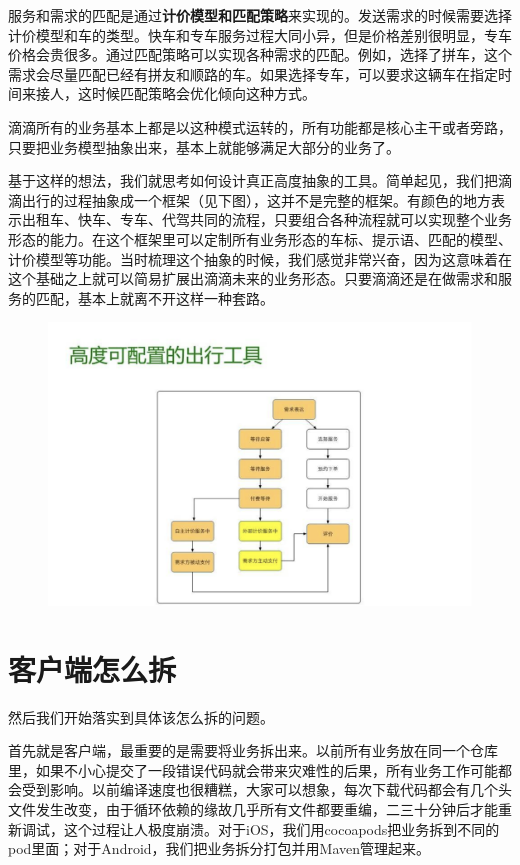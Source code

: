\documentclass[12pt]{article}
\begin{document}
服务和需求的匹配是通过\textbf{计价模型和匹配策略}来实现的。发送需求的时候需要选择计价模型和车的类型。快车和专车服务过程大同小异，但是价格差别很明显，专车价格会贵很多。通过匹配策略可以实现各种需求的匹配。例如，选择了拼车，这个需求会尽量匹配已经有拼友和顺路的车。如果选择专车，可以要求这辆车在指定时间来接人，这时候匹配策略会优化倾向这种方式。

滴滴所有的业务基本上都是以这种模式运转的，所有功能都是核心主干或者旁路，只要把业务模型抽象出来，基本上就能够满足大部分的业务了。

基于这样的想法，我们就思考如何设计真正高度抽象的工具。简单起见，我们把滴滴出行的过程抽象成一个框架（见下图），这并不是完整的框架。有颜色的地方表示出租车、快车、专车、代驾共同的流程，只要组合各种流程就可以实现整个业务形态的能力。在这个框架里可以定制所有业务形态的车标、提示语、匹配的模型、计价模型等功能。当时梳理这个抽象的时候，我们感觉非常兴奋，因为这意味着在这个基础之上就可以简易扩展出滴滴未来的业务形态。只要滴滴还是在做需求和服务的匹配，基本上就离不开这样一种套路。

\begin{figure}[H]
    \centering
    \includegraphics[width=1\textwidth]{fig/DIDI_Reconstruction_12.png}
\end{figure}

\section{客户端怎么拆}
然后我们开始落实到具体该怎么拆的问题。

首先就是客户端，最重要的是需要将业务拆出来。以前所有业务放在同一个仓库里，如果不小心提交了一段错误代码就会带来灾难性的后果，所有业务工作可能都会受到影响。以前编译速度也很糟糕，大家可以想象，每次下载代码都会有几个头文件发生改变，由于循环依赖的缘故几乎所有文件都要重编，二三十分钟后才能重新调试，这个过程让人极度崩溃。对于iOS，我们用cocoapods把业务拆到不同的pod里面；对于Android，我们把业务拆分打包并用Maven管理起来。
\end{document}
